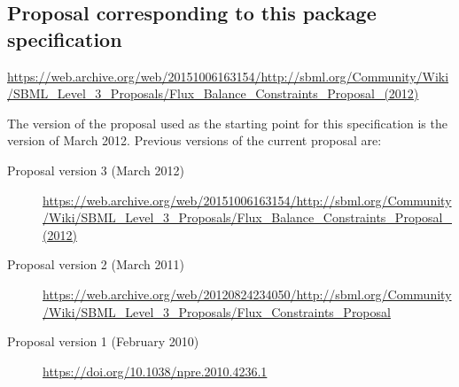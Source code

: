 \subsection{Proposal corresponding to this package specification}


  \vspace*{1ex}\small
  \url{https://web.archive.org/web/20151006163154/http://sbml.org/Community/Wiki/SBML_Level_3_Proposals/Flux_Balance_Constraints_Proposal_(2012)}
  \vspace*{1ex}

The version of the proposal used as the starting point for this specification is the version of March 2012. Previous versions of the current proposal are:

\begin{description}
  \item[Proposal version 3 (March 2012)]
  \item [] {\small\url{https://web.archive.org/web/20151006163154/http://sbml.org/Community/Wiki/SBML_Level_3_Proposals/Flux_Balance_Constraints_Proposal_(2012)}}
  \item[Proposal version 2 (March 2011)]
  \item [] {\small\url{https://web.archive.org/web/20120824234050/http://sbml.org/Community/Wiki/SBML_Level_3_Proposals/Flux_Constraints_Proposal}}
  \item[Proposal version 1 (February 2010)]
  \item [] {\small\url{https://doi.org/10.1038/npre.2010.4236.1}}
\end{description}


